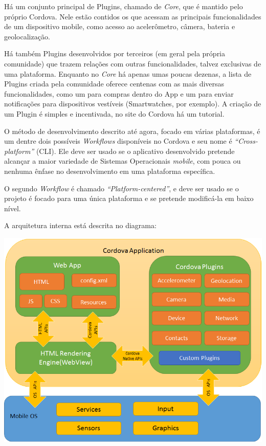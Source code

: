 \documentclass[a4paper,12pt]{article}
\begin{document}
Há um conjunto principal de Plugins, chamado de \emph{Core}, que é mantido pelo próprio Cordova. Nele estão contidos os que acessam as principais funcionalidades de um dispositivo mobile, como acesso ao acelerômetro, câmera, bateria e geolocalização.

Há também Plugins desenvolvidos por terceiros (em geral pela própria comunidade) que trazem relações com outras funcionalidades, talvez exclusivas de uma plataforma. Enquanto no \emph{Core} há apenas umas poucas dezenas, a lista de Plugins criada pela comunidade oferece centenas com as mais diversas funcionalidades, como um para compras dentro do App e um para enviar notificações para dispositivos vestíveis (Smartwatches, por exemplo). A criação de um Plugin é simples e incentivada, no site do Cordova há um tutorial.

O método de desenvolvimento descrito até agora, focado em várias plataformas, é um dentre dois possíveis \emph{Workflows} disponíveis no Cordova e seu nome é \emph{“Cross-platform”} (CLI). Ele deve ser usado se o aplicativo desenvolvido pretende alcançar a maior variedade de Sistemas Operacionais \emph{mobile}, com pouca ou nenhuma ênfase no desenvolvimento em uma plataforma específica.

O segundo \emph{Workflow} é chamado \emph{“Platform-centered”}, e deve ser usado se o projeto é focado para uma única plataforma e se pretende modificá-la em baixo nível.

A arquitetura interna está descrita no diagrama:

\includegraphics[width=1\linewidth]{images/cordovaapparchitecture.png}
\end{document}
